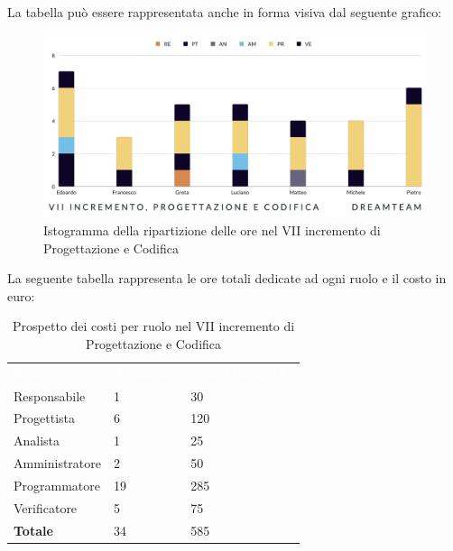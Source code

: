 La tabella può essere rappresentata anche in forma visiva dal seguente grafico:
\begin{figure}[H]
\centering
\includegraphics[scale=0.55]{Sezioni/SezioniPreventivo/grafici/Preventivo_progettazione_VII.png}
\caption{Istogramma della ripartizione delle ore nel VII incremento di Progettazione e Codifica}
\end{figure}

La seguente tabella rappresenta le ore totali dedicate ad ogni ruolo e il costo in euro:

\begin{table}[H]
\begin{center}
\renewcommand{\arraystretch}{1.5}
\begin{tabular}{ m{}<{\centering}  m{}<{\centering} m{}<{\centering}}
	\rowcolor{darkblue}
	\textcolor{white}{\textbf{Ruolo}}&\textcolor{white}{\textbf{Totale ore}}&\textcolor{white}{\textbf{Costo totale (\euro)}}\\ 

	Responsabile  & 1 & 30 \\	
	
	Progettista & 6 & 120 \\
	
	Analista & 1 & 25 \\

	Amministratore & 2 & 50 \\
	
	Programmatore & 19 & 285 \\
	
	Verificatore & 5 & 75 \\
	
	\textbf{Totale} & 34 & 585 \\
	
\end{tabular}
\caption{Prospetto dei costi per ruolo nel VII incremento di Progettazione e Codifica}
\end{center}
\end{table}


